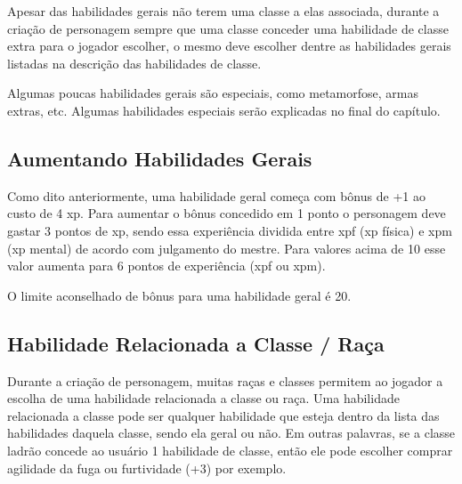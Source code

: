 
Apesar das habilidades gerais não terem uma classe a elas associada, durante a criação de personagem sempre que uma classe conceder uma habilidade de classe extra para o jogador escolher, o mesmo deve escolher dentre as habilidades gerais listadas na descrição das habilidades de classe.

Algumas poucas habilidades gerais são especiais, como metamorfose, armas extras, etc. Algumas habilidades especiais serão explicadas no final do capítulo.


\subsection{Aumentando Habilidades Gerais}

Como dito anteriormente, uma habilidade geral começa com bônus de +1 ao custo de 4 xp. Para aumentar o bônus concedido em 1 ponto o personagem deve gastar 3 pontos de xp, sendo essa experiência dividida entre xpf (xp física) e xpm (xp mental) de acordo com julgamento do mestre. Para valores acima de 10 esse valor aumenta para 6 pontos de experiência (xpf ou xpm).

O limite aconselhado de bônus para uma habilidade geral é 20.

\subsection{Habilidade Relacionada a Classe / Raça}
 
Durante a criação de personagem, muitas raças e classes permitem ao jogador a escolha de uma habilidade relacionada a classe ou raça. Uma habilidade relacionada a classe pode ser qualquer habilidade que esteja dentro da lista das habilidades daquela classe, sendo ela geral ou não. Em outras palavras, se a classe ladrão concede ao usuário 1 habilidade de classe, então ele pode escolher comprar agilidade da fuga ou furtividade (+3) por exemplo.

